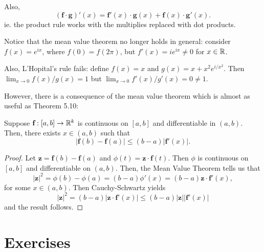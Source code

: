 Also,
\[
    (\textbf{f} \cdot \textbf{g})'(x) = \textbf{f}'(x) \cdot \textbf{g}(x) + \textbf{f}(x) \cdot \textbf{g}'(x).
\]
ie. the product rule works with the multiplies replaced with dot products.

Notice that the mean value theorem no longer holds in general: consider $f(x) = e^{ix}$, where $f(0) = f(2\pi)$, but $f'(x) = ie^{ix} \ne 0$ for $x \in \mathbb{R}$.

Also, L'Hopital's rule fails: define $f(x) = x$ and $g(x) = x + x^2 e^{i/x^2}$. Then $\lim_{x \to 0} f(x)/g(x) = 1$ but $\lim_{x \to 0} f'(x) / g'(x) = 0 \ne 1$.

However, there is a consequence of the mean value theorem which is almost as useful as Theorem 5.10:

\begin{theorem} %
    Suppose $\textbf{f}: [a, b] \rightarrow \mathbb{R}^k$ is continuous on $[a, b]$ and differentiable in $(a, b)$. Then, there exists $x \in (a, b)$ such that
    \[
        |\textbf{f}(b) - \textbf{f}(a)| \le (b - a) |\textbf{f}'(x)|.
    \]
    
    \begin{proof}
        Let $\textbf{z} = \textbf{f}(b) - \textbf{f}(a)$ and $\phi(t) = \textbf{z} \cdot \textbf{f}(t)$. Then $\phi$ is continuous on $[a, b]$ and differentiable on $(a, b)$. Then, the Mean Value Theorem tells us that
        \[
            |\textbf{z}|^2 = \phi(b) - \phi(a) = (b - a) \phi'(x) = (b - a) \textbf{z} \cdot \textbf{f}'(x),
        \]
        for some $x \in (a, b)$. Then Cauchy-Schwartz yields
        \[
            |\textbf{z}|^2 = (b - a) |\textbf{z} \cdot \textbf{f'}(x)| \le (b - a) |\textbf{z}| |\textbf{f}'(x)|
        \]
        and the result follows.
    \end{proof}
\end{theorem}

\section{Exercises}

